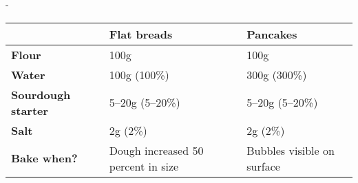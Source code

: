 -\begin{tabular}{lll}
\toprule
                           & \textbf{Flat breads}               & \textbf{Pancakes}          \\ \midrule
\textbf{Flour}             & 100g                               & 100g                       \\ 
\textbf{Water}             & 100g (100\%)                       & 300g (300\%)               \\ 
\textbf{Sourdough starter} & 5--20g (5--20\%)                   & 5--20g (5--20\%)           \\ 
\textbf{Salt}              & 2g (2\%)                           & 2g (2\%)                   \\ 
\textbf{Bake when?}        & Dough increased 50 percent in size & Bubbles visible on surface \\ \bottomrule
\end{tabular}
